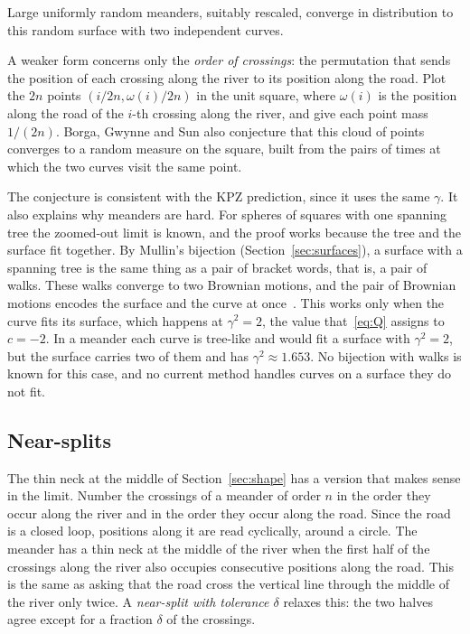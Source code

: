 \begin{conjecture}\label{conj:bgs}
Large uniformly random meanders, suitably rescaled, converge in distribution to this random
surface with two independent curves.
\end{conjecture}

A weaker form concerns only the \emph{order of crossings}: the permutation that sends the
position of each crossing along the river to its position along the road. Plot the $2n$ points
$(i/2n,\omega(i)/2n)$ in the unit square, where $\omega(i)$ is the position along the road of the
$i$-th crossing along the river, and give each point mass $1/(2n)$. Borga, Gwynne and Sun also
conjecture that this cloud of points converges to a random measure on the square, built from the
pairs of times at which the two curves visit the same point.

The conjecture is consistent with the KPZ prediction, since it uses the same $\gamma$. It also
explains why meanders are hard. For spheres of squares with one spanning tree the zoomed-out limit
is known, and the proof works because the tree and the surface fit together. By Mullin's bijection
(Section~\ref{sec:surfaces}), a surface with a spanning tree is the same thing as a pair of
bracket words, that is, a pair of walks. These walks converge to two Brownian motions, and the
pair of Brownian motions encodes the surface and the curve at once~\cite{Sheffield,DMS}. This
works only when the curve fits its surface, which happens at $\gamma^2=2$, the value
that~\eqref{eq:Q} assigns to $c=-2$. In a meander each curve is tree-like and would fit a surface
with $\gamma^2=2$, but the surface carries two of them and has $\gamma^2\approx1.653$. No
bijection with walks is known for this case, and no current method handles curves on a surface
they do not fit.

\subsection{Near-splits}

The thin neck at the middle of Section~\ref{sec:shape} has a version that makes sense in the
limit. Number the crossings of a meander of order $n$ in the order they occur along the river and
in the order they occur along the road. Since the road is a closed loop, positions along it are
read cyclically, around a circle. The meander has a thin neck at the middle of the river when the
first half of the crossings along the river also occupies consecutive positions along the road.
This is the same as asking that the road cross the vertical line through the middle of the river
only twice. A \emph{near-split with tolerance $\delta$} relaxes this: the two halves agree except
for a fraction $\delta$ of the crossings.

